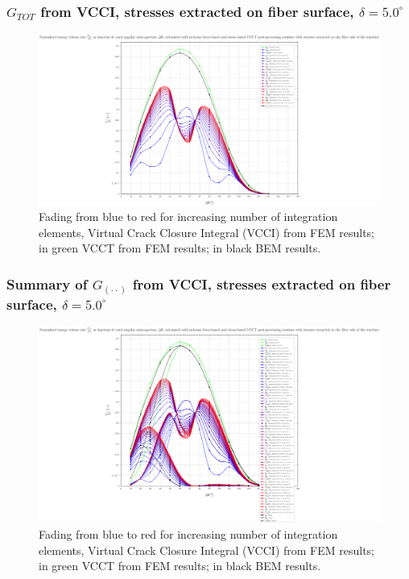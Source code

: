 \begin{frame}
\frametitle{\small $G_{TOT}$ from VCCI, stresses extracted on fiber surface, $\delta=5.0^{\circ}$}
\vspace{-0.75cm}
\centering
\captionsetup[figure]{font=scriptsize,labelfont=scriptsize}
\begin{figure}[!h]
\centering
\includegraphics[height=0.7\textheight]{2017-07-25_AbqRunSummary_SmallStrain_D05/pdf/2017-07-25_AbqRunSummary_SmallStrain_D05_F-SoF-VCCT_GTOT.pdf}
  \caption{\scriptsize Fading from blue to red for increasing number of integration elements, Virtual Crack Closure Integral (VCCI) from FEM results; in green VCCT from FEM results; in black BEM results.}
  \label{fig:res1}
\end{figure}
\end{frame}
\begin{frame}
\frametitle{\small Summary of $G_{\left(\cdot\cdot\right)}$ from VCCI, stresses extracted on fiber surface, $\delta=5.0^{\circ}$}
\vspace{-0.75cm}
\centering
\captionsetup[figure]{font=scriptsize,labelfont=scriptsize}
\begin{figure}[!h]
\centering
\includegraphics[height=0.7\textheight]{2017-07-25_AbqRunSummary_SmallStrain_D05/pdf/2017-07-25_AbqRunSummary_SmallStrain_D05_F-SoF-VCCT_Summary.pdf}
  \caption{\scriptsize Fading from blue to red for increasing number of integration elements, Virtual Crack Closure Integral (VCCI) from FEM results; in green VCCT from FEM results; in black BEM results.}
  \label{fig:res1}
\end{figure}
\end{frame}

